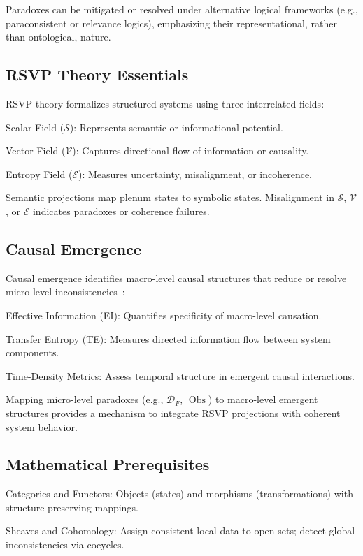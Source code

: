 \documentclass[12pt]{article}
\theoremstyle{plain}
\begin{document}
Paradoxes can be mitigated or resolved under alternative logical frameworks (e.g., paraconsistent or relevance logics), emphasizing their representational, rather than ontological, nature.

\subsection{RSVP Theory Essentials}

RSVP theory formalizes structured systems using three interrelated fields:

Scalar Field (\(\mathcal{S}\)): Represents semantic or informational potential.

Vector Field (\(\mathcal{V}\)): Captures directional flow of information or causality.

Entropy Field (\(\mathcal{E}\)): Measures uncertainty, misalignment, or incoherence.

Semantic projections map plenum states to symbolic states. Misalignment in \(\mathcal{S}\), \(\mathcal{V}\), or \(\mathcal{E}\) indicates paradoxes or coherence failures.

\subsection{Causal Emergence}

Causal emergence identifies macro-level causal structures that reduce or resolve micro-level inconsistencies~\citep{Yuan2024}:

Effective Information (EI): Quantifies specificity of macro-level causation.

Transfer Entropy (TE): Measures directed information flow between system components.

Time-Density Metrics: Assess temporal structure in emergent causal interactions.

Mapping micro-level paradoxes (e.g., \(\mathcal{D}_F\), \(\operatorname{Obs}\)) to macro-level emergent structures provides a mechanism to integrate RSVP projections with coherent system behavior.

\subsection{Mathematical Prerequisites}

Categories and Functors: Objects (states) and morphisms (transformations) with structure-preserving mappings.

Sheaves and Cohomology: Assign consistent local data to open sets; detect global inconsistencies via cocycles.
\end{document}
